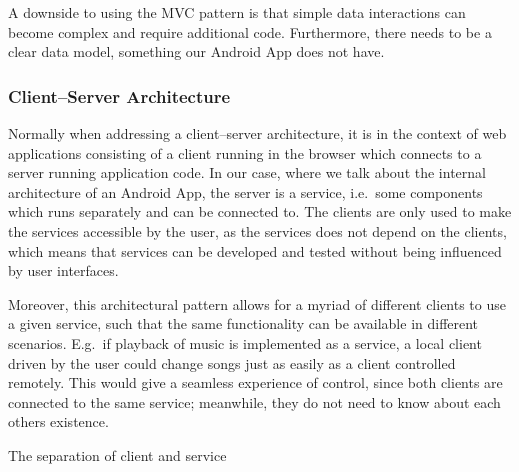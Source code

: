 A downside to using the MVC pattern is that simple data interactions can become complex and require additional code.
Furthermore, there needs to be a clear data model, something our Android App does not have.

\subsubsection{Client--Server Architecture}
Normally when addressing a client--server architecture, it is in the context of web applications consisting of a client running in the browser which connects to a server running application code.
In our case, where we talk about the internal architecture of an Android App, the server is a service, i.e.~some components which runs separately and can be connected to.
The clients are only used to make the services accessible by the user, as the services does not depend on the clients, which means that services can be developed and tested without being influenced by user interfaces.

Moreover, this architectural pattern allows for a myriad of different clients to use a given service, such that the same functionality can be available in different scenarios.
E.g.~if playback of music is implemented as a service, a local client driven by the user could change songs just as easily as a client controlled remotely.
This would give a seamless experience of control, since both clients are connected to the same service; meanwhile, they do not need to know about each others existence.

The separation of client and service

